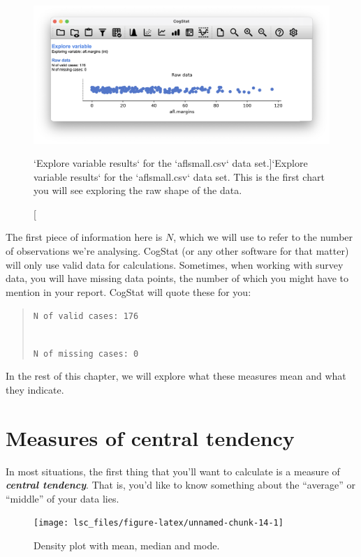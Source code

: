 \documentclass[
  11pt,
  a4paper,
  twoside,symmetric,openright]{book}
\theoremstyle{break}
\theoremstyle{break}
\begin{document}
\begin{figure}

{\centering \includegraphics[width=0.6\linewidth]{resources/image/cogstatrawaflsmall} 

}

\caption[`Explore variable results` for the `aflsmall.csv` data set.]{`Explore variable results` for the `aflsmall.csv` data set. This is the first chart you will see exploring the raw shape of the data.}\label{fig:rawaflsmall}
\end{figure}

The first piece of information here is \(N\), which we will use to refer to the number of observations we're analysing. CogStat (or any other software for that matter) will only use valid data for calculations. Sometimes, when working with survey data, you will have missing data points, the number of which you might have to mention in your report. CogStat will quote these for you:

\begin{quote}
\texttt{N\ of\ valid\ cases:\ 176}\strut \\
\texttt{N\ of\ missing\ cases:\ 0}
\end{quote}

In the rest of this chapter, we will explore what these measures mean and what they indicate.

\section{Measures of central tendency}\label{centraltendency}

In most situations, the first thing that you'll want to calculate is a measure of \textbf{\emph{central tendency}}. That is, you'd like to know something about the ``average'' or ``middle'' of your data lies.

\begin{figure}

{\centering \texttt{[image: lsc\_files/figure-latex/unnamed-chunk-14-1]} 

}

\caption{Density plot with mean, median and mode.}\label{fig:unnamed-chunk-14}
\end{figure}
\end{document}
